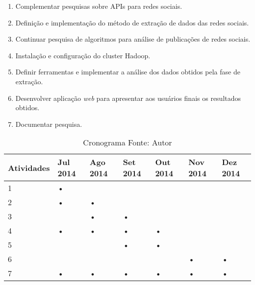 \begin{enumerate}

  \item Complementar pesquisas sobre APIs para redes sociais.
  \item Definição e implementação do método de extração de dados das redes sociais.
  \item Continuar pesquisa de algoritmos para análise de publicações de redes sociais.
  \item Instalação e configuração do cluster Hadoop.
  \item Definir ferramentas e implementar a análise dos dados obtidos pela fase de extração.
  \item Desenvolver aplicação \textit{web} para apresentar aos usuários finais os resultados obtidos.
  \item Documentar pesquisa.

\end{enumerate}


\begin{table}[!ht]
\begin{center}
  \setlength\tabcolsep{1pt}
  \begin{tabular}{|p{2cm}|p{2cm}|p{2cm}|p{2cm}|p{2cm}|p{2cm}|p{2cm}|}
	\hline
	Atividades & Jul 2014 & Ago 2014 & Set 2014 & Out 2014 & Nov 2014 & Dez 2014
	\\ \hline
	1 & • &   &   &   &   &   	\\ \hline
	2 & • & • &   &   &   &   	\\ \hline
	3 &   & • & • &   &   &   	\\ \hline
	4 & • & • & • & • &   &   	\\ \hline
	5 &   &   & • & • &   &   	\\ \hline
	6 &   &   &   &   & • & •   	\\ \hline
	7 & • & • & • & • & • & •   	\\ \hline
  \end{tabular}
  \captionsetup{justification=centering}
  \caption[Cronograma]{Cronograma
  \protect\linebreak Fonte: Autor}
\label{tab-cron}
\end{center}
\end{table}
\FloatBarrier















